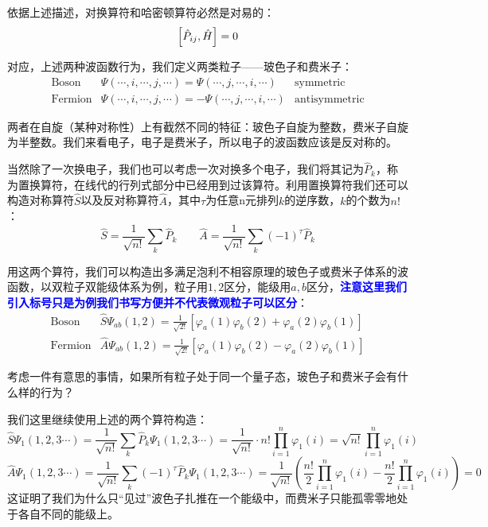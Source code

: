 依据上述描述，对换算符和哈密顿算符必然是对易的：
\[\qty[\hat{P}_{ij},\hat{H}]=0\]

对应，上述两种波函数行为，我们定义两类粒子——玻色子和费米子：
\[
    \begin{array}{lll}
        \text{Boson} & \varPsi(\cdots,i,\cdots,j,\cdots)=\varPsi(\cdots,j,\cdots,i,\cdots) & \text{symmetric} \\
        \text{Fermion} & \varPsi(\cdots,i,\cdots,j,\cdots)=-\varPsi(\cdots,j,\cdots,i,\cdots) & \text{antisymmetric}
    \end{array}
\]

两者在自旋（某种对称性）上有截然不同的特征：玻色子自旋为整数，费米子自旋为半整数。我们来看电子，电子是费米子，所以电子的波函数应该是反对称的。

当然除了一次换电子，我们也可以考虑一次对换多个电子，我们将其记为$\hat{P}_k$，称为置换算符，在线代的行列式部分中已经用到过该算符。利用置换算符我们还可以构造对称算符$\hat{S}$以及反对称算符$\hat{A}$，其中$\tau$为任意n元排列$k$的逆序数，$k$的个数为$n!$：
\[\hat{S}=\frac{1}{\sqrt{n!}}\sum_{k}\hat{P}_{k} \qquad \hat{A}=\frac{1}{\sqrt{n!}}\sum_{k}(-1)^{\tau}\hat{P}_{k}\]

用这两个算符，我们可以构造出多满足泡利不相容原理的玻色子或费米子体系的波函数，以双粒子双能级体系为例，粒子用$1,2$区分，能级用$a,b$区分，\textcolor{blue}{\textbf{注意这里我们引入标号只是为例我们书写方便并不代表微观粒子可以区分}}：
\[
    \begin{array}{ll}
        \text{Boson} & \hat{S}\varPsi_{ab}(1,2)=\frac{1}{\sqrt{2!}}[\varphi_a(1)\varphi_b(2)+\varphi_a(2)\varphi_b(1)]\\
        \text{Fermion} & \hat{A}\varPsi_{ab}(1,2)=\frac{1}{\sqrt{2!}}[\varphi_a(1)\varphi_b(2)-\varphi_a(2)\varphi_b(1)] 
    \end{array}
\]

考虑一件有意思的事情，如果所有粒子处于同一个量子态，玻色子和费米子会有什么样的行为？

我们这里继续使用上述的两个算符构造：
\[\hat{S}\varPsi_{1}(1,2,3 \cdots)=\frac{1}{\sqrt{n!}}\sum_{k}\hat{P}_{k}\varPsi_{1}(1,2,3 \cdots)=\frac{1}{\sqrt{n!}}\cdot n!\prod_{i=1}^n\varphi_1(i)=\sqrt{n!}\prod_{i=1}^n\varphi_1(i)\]
\[\hat{A}\varPsi_{1}(1,2,3 \cdots)=\frac{1}{\sqrt{n!}}\sum_{k}(-1)^{\tau}\hat{P}_{k}\varPsi_{1}(1,2,3 \cdots)=\frac{1}{\sqrt{n!}}\left (\frac{n!}{2}\prod_{i=1}^n\varphi_1(i)-\frac{n!}{2}\prod_{i=1}^n\varphi_1(i) \right )=0\]
这证明了我们为什么只“见过”波色子扎推在一个能级中，而费米子只能孤零零地处于各自不同的能级上。

